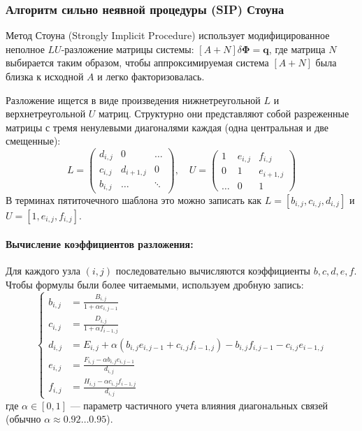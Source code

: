 \documentclass[a4paper,12pt]{article}
\begin{document}
	
	\subsubsection{Алгоритм сильно неявной процедуры (SIP) Стоуна}
	
	Метод Стоуна \cite{stone1968} (Strongly Implicit Procedure) использует модифицированное неполное $LU$-разложение матрицы системы: $[A+N] \delta \boldsymbol{\Phi} = \mathbf{q}$, где матрица $N$ выбирается таким образом, чтобы аппроксимируемая система $[A+N]$ была близка к исходной $A$ и легко факторизовалась.
	
	Разложение ищется в виде произведения нижнетреугольной $L$ и верхнетреугольной $U$ матриц. Структурно они представляют собой разреженные матрицы с тремя ненулевыми диагоналями каждая (одна центральная и две смещенные):
	\[
	L = \begin{pmatrix}
		d_{i,j} & 0 & \dots \\
		c_{i,j} & d_{i+1,j} & 0 \\
		b_{i,j} & \dots & \ddots
	\end{pmatrix}, \quad
	U = \begin{pmatrix}
		1 & e_{i,j} & f_{i,j} \\
		0 & 1 & e_{i+1,j} \\
		\dots & 0 & 1
	\end{pmatrix}
	\]
	В терминах пятиточечного шаблона это можно записать как $L = [b_{i,j}, c_{i,j}, d_{i,j}]$ и $U = [1, e_{i,j}, f_{i,j}]$.

	\paragraph{Вычисление коэффициентов разложения:}
	Для каждого узла $(i,j)$ последовательно вычисляются коэффициенты $b, c, d, e, f$. Чтобы формулы были более читаемыми, используем дробную запись:
	\begin{equation}
		\displaystyle
		\left\{
		\begin{aligned}
			b_{i,j} &= \frac{B_{i,j}}{1 + \alpha e_{i,j-1}} \\[10pt]
			c_{i,j} &= \frac{D_{i,j}}{1 + \alpha f_{i-1,j}} \\[10pt]
			d_{i,j} &= E_{i,j} + \alpha (b_{i,j} e_{i,j-1} + c_{i,j} f_{i-1,j}) - b_{i,j} f_{i,j-1} - c_{i,j} e_{i-1,j} \\[10pt]
			e_{i,j} &= \frac{F_{i,j} - \alpha b_{i,j} e_{i,j-1}}{d_{i,j}} \\[10pt]
			f_{i,j} &= \frac{H_{i,j} - \alpha c_{i,j} f_{i-1,j}}{d_{i,j}}
		\end{aligned}
		\right.
	\end{equation}
	где $\alpha \in [0, 1]$ — параметр частичного учета влияния диагональных связей (обычно $\alpha \approx 0.92 \dots 0.95$).
	
\end{document}
